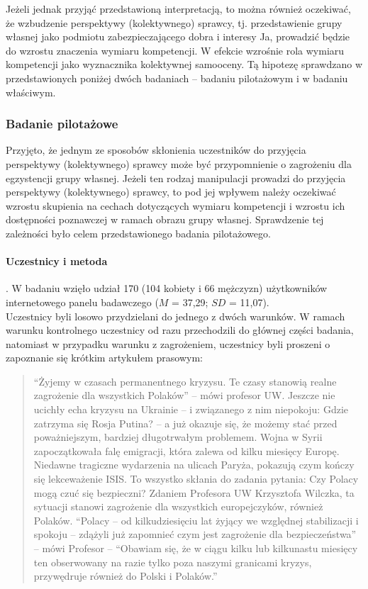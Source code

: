 \documentclass[man]{apa6}
\begin{document}
Jeżeli jednak przyjąć przedstawioną interpretacją, to można również oczekiwać, że wzbudzenie perspektywy (kolektywnego) sprawcy, tj. przedstawienie grupy własnej jako podmiotu zabezpieczającego dobra i interesy Ja, prowadzić będzie do wzrostu znaczenia wymiaru kompetencji. W efekcie wzrośnie rola wymiaru kompetencji jako wyznacznika kolektywnej samooceny. Tą hipotezę sprawdzano w przedstawionych poniżej dwóch badaniach -- badaniu pilotażowym i w badaniu właściwym.\\

\subsubsection{Badanie pilotażowe}
Przyjęto, że jednym ze sposobów skłonienia uczestników do przyjęcia perspektywy (kolektywnego) sprawcy może być przypomnienie o zagrożeniu dla egzystencji grupy własnej. Jeżeli ten rodzaj manipulacji prowadzi do przyjęcia perspektywy (kolektywnego) sprawcy, to pod jej wpływem należy oczekiwać wzrostu skupienia na cechach dotyczących wymiaru kompetencji i wzrostu ich dostępności poznawczej w ramach obrazu grupy własnej. Sprawdzenie tej zależności było celem przedstawionego badania pilotażowego.

\paragraph{Uczestnicy i metoda}.
W badaniu wzięło udział 170 (104 kobiety i 66 mężczyzn) użytkowników internetowego panelu badawczego ($M$ = 37,29; $SD$ = 11,07).\\

Uczestnicy byli losowo przydzielani do jednego z dwóch warunków. W ramach warunku kontrolnego uczestnicy od razu przechodzili do głównej części badania, natomiast w przypadku warunku z zagrożeniem, uczestnicy byli proszeni o zapoznanie się krótkim artykułem prasowym:
\blockquote{``Żyjemy w czasach permanentnego kryzysu. Te czasy stanowią realne zagrożenie dla wszystkich Polaków'' -- mówi profesor UW. Jeszcze nie ucichły echa kryzysu na Ukrainie -- i związanego z nim niepokoju: Gdzie zatrzyma się Rosja Putina? -- a już okazuje się, że możemy stać przed poważniejszym, bardziej długotrwałym problemem. Wojna w Syrii zapoczątkowała falę emigracji, która zalewa od kilku miesięcy Europę. Niedawne tragiczne wydarzenia na ulicach Paryża, pokazują czym kończy się lekceważenie ISIS. To wszystko skłania do zadania pytania: Czy Polacy mogą czuć się bezpieczni? Zdaniem Profesora UW Krzysztofa Wilczka, ta sytuacji stanowi zagrożenie dla wszystkich europejczyków, również Polaków. ``Polacy -- od kilkudziesięciu lat żyjący we względnej stabilizacji i spokoju -- zdążyli już zapomnieć czym jest zagrożenie dla bezpieczeństwa'' -- mówi Profesor -- ``Obawiam się, że w ciągu kilku lub kilkunastu miesięcy ten obserwowany na razie tylko poza naszymi granicami kryzys, przywędruje również do Polski i Polaków.''}
\end{document}
